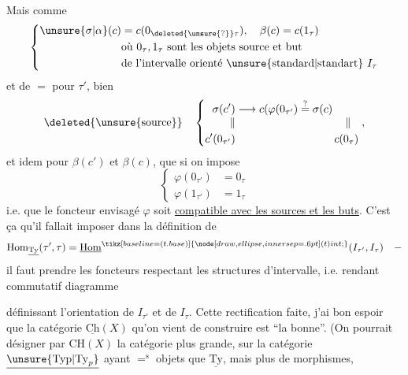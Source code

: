 Mais comme 
\[ \left\{\begin{aligned}\unsure{\sigma|\alpha}(c)&=c(0_{\deleted{\unsure{?}}\tau}),\quad \beta(c)=c(1_\tau)\\
&\text{où }0_\tau,1_\tau\text{ sont les objets source et but}\\
&\text{de l'intervalle orienté \unsure{standard|standart} }I_\tau
\end{aligned}\right. \]
et de $=$ pour $\tau'$,    bien
\[ \text{\deleted{\unsure{source}}}\quad\left\{\begin{aligned}
\sigma(c')&\longrightarrow c(\varphi(0_{\tau'})\overset{?}{=}\sigma(c)\\[-3pt]
\Vert &\hspace{10em}\Vert\\
c'(0_{\tau'})&\hspace{9em}c(0_\tau)
\end{aligned}\right., \]
et idem pour $\beta(c')$ et $\beta(c)$, que si on impose
\[ \boxed{\left\{\begin{aligned}\varphi(0_{\tau'})&=0_\tau\\ \varphi(1_{\tau'})&=1_\tau\end{aligned}\right.} \]
i.e. que le foncteur envisagé $\varphi$ soit \uline{compatible avec les sources et les buts}. C'est ça  qu'il fallait imposer dans \deleted{\unsure{$\varphi$}} la définition de
\[ \mathrm{Hom}_{\underline{\mathrm{Ty}}}(\tau',\tau)=\underline{\mathrm{Hom}}^{\tikz[baseline=(t.base)]{\node[draw,ellipse,inner sep=.6pt] (t) {\scriptsize int};}}(I_{\tau'},I_\tau)\quad - \]
il faut prendre les foncteurs \inserted{$\varphi$} respectant les structures d'intervalle, i.e. rendant commutatif  diagramme

définissant l'orientation de $I_{\tau'}$ et de $I_\tau$. Cette rectification faite, j'ai bon espoir que la catégorie $\underline{\mathrm{Ch}}(X)$ qu'on vient de construire est ``la bonne''. (On pourrait désigner par $\mathrm{CH}(X)$ la catégorie plus grande, sur la catégorie $\underline{\unsure{\mathrm{Typ}|\mathrm{Ty}_p}}$  ayant ${=}^{\mathrm s}$ objets que $\underline{\mathrm{Ty}}$, mais plus de morphismes, 

